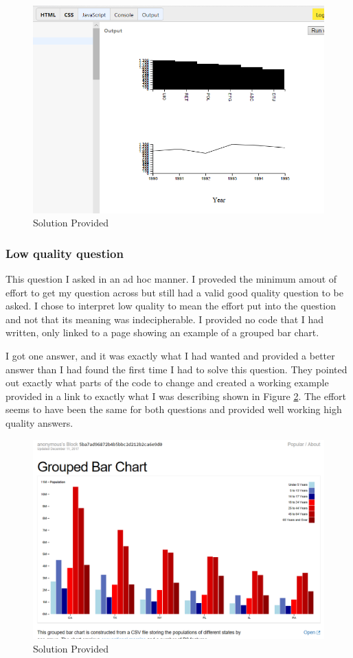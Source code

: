 \documentclass[letterpaper,12pt]{article}
\begin{document}
\begin{figure}[h]
  \includegraphics[width=\linewidth]{105highanswer.PNG}
  \caption{Solution Provided}
  \label{highQ}
\end{figure}

\subsubsection{Low quality question}
This question I asked in an ad hoc manner. I proveded the minimum amout of effort to get my question across but still had a valid good quality question to be asked. I chose to interpret low quality to mean the effort put into the question and not that its meaning was indecipherable. I provided no code that I had written, only linked to a page showing an example of a grouped bar chart.


I got one answer, and it was exactly what I had wanted and provided a better answer than I had found the first time I had to solve this question. They pointed out exactly what parts of the code to change and created a working example provided in a link to exactly what I was describing shown in Figure \ref{lowQ}. The effort seems to have been the same for both questions and provided well working high quality answers.

\begin{figure}[h]
  \includegraphics[width=\linewidth]{105answer.PNG}
  \caption{Solution Provided}
  \label{lowQ}
\end{figure}
\end{document}

